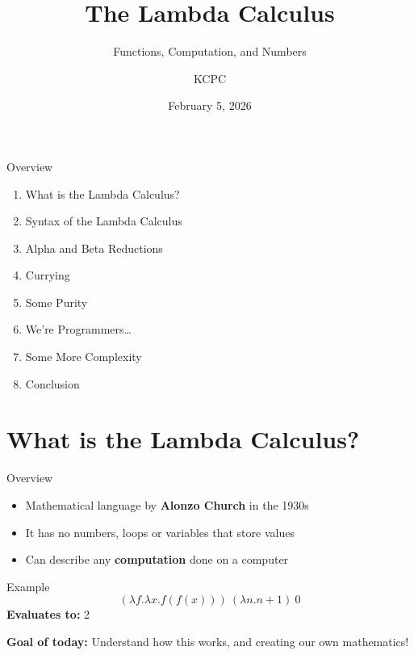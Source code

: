 \documentclass{beamer}
\title{The Lambda Calculus}
\subtitle{Functions, Computation, and Numbers}
\author{KCPC}
\date{February 5, 2026}
\begin{document}
\begin{frame}[plain]\titlepage\end{frame}

\begin{frame}{Overview}
  \begin{enumerate}
    \item What is the Lambda Calculus?
    \item Syntax of the Lambda Calculus
    \item Alpha and Beta Reductions
    \item Currying
    \item Some Purity
    \item We're Programmers\dots
    \item Some More Complexity
    \item Conclusion
  \end{enumerate}
\end{frame}

\section{What is the Lambda Calculus?}
\begin{frame}{Overview}
  \begin{itemize}
    \item Mathematical language by \textbf{Alonzo Church} in the 1930s
    \item It has no numbers, loops or variables that store values
    \item Can describe any \textbf{computation} done on a computer
  \end{itemize}
\end{frame}
\begin{frame}{Example}
  \[(\lambda f.\lambda x.f(f(x)))\ (\lambda n.n+1)\ 0\]
  \textbf{Evaluates to:} 2

  \textbf{Goal of today:} Understand how this works, and creating our own mathematics!
\end{frame}
\end{document}
